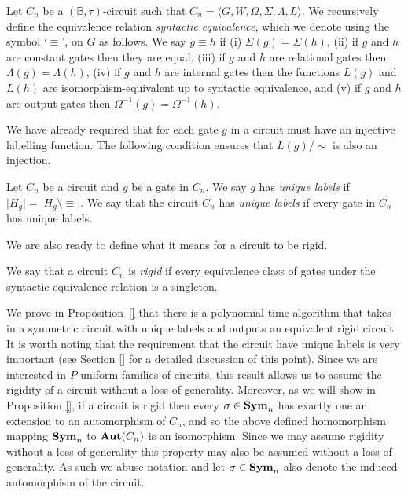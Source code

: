 \documentclass[../paper.tex]{subfiles}
\begin{document}
\begin{definition}
  Let $C_n$ be a $(\mathbb{B}, \tau)$-circuit such that $C_n = \langle G, W,
  \Omega, \Sigma, \Lambda, L\rangle$. We recursively define the equivalence
  relation \emph{syntactic equivalence}, which we denote using the symbol
  `$\equiv$', on $G$ as follows. We say $g \equiv h$ if (i) $\Sigma(g) =
  \Sigma(h)$, (ii) if $g$ and $h$ are constant gates then they are equal, (iii)
  if $g$ and $h$ are relational gates then $\Lambda(g) = \Lambda(h)$, (iv) if
  $g$ and $h$ are internal gates then the functions $L(g)$ and $L(h)$ are
  isomorphism-equivalent up to syntactic equivalence, and (v) if $g$ and $h$ are
  output gates then $\Omega^{-1}(g) = \Omega^{-1}(h)$.
\end{definition}

We have already required that for each gate $g$ in a circuit must have an
injective labelling function. The following condition ensures that $L(g)/{\sim}$
is also an injection.

\begin{definition}
  Let $C_n$ be a circuit and $g$ be a gate in $C_n$. We say $g$ has \emph{unique
    labels} if $\vert H_g \vert = \vert H_g \setminus \equiv \vert $. We say
  that the circuit $C_n$ has \emph{unique labels} if every gate in $C_n$ has
  unique labels.
\end{definition}

We are also ready to define what it means for a circuit to be rigid.

\begin{definition}
  We say that a circuit $C_n$ is \emph{rigid} if every equivalence class of
  gates under the syntactic equivalence relation is a singleton.
\end{definition}

We prove in Proposition~\ref{} that there is a polynomial time algorithm that
takes in a symmetric circuit with unique labels and outputs an equivalent rigid
circuit. It is worth noting that the requirement that the circuit have unique
labels is very important (see Section \ref{} for a detailed discussion of this
point). Since we are interested in $P$-uniform families of circuits, this result
allows us to assume the rigidity of a circuit without a loss of generality.
Moreover, as we will show in Proposition \ref{}, if a circuit is rigid then
every $\sigma \in \text{\textbf{Sym}}_n$ has exactly one an extension to an automorphism of
$C_n$, and so the above defined homomorphism mapping $\text{\textbf{Sym}}_n$ to $\text{\textbf{Aut}}(C_n)$ is
an isomorphism. Since we may assume rigidity without a loss of generality this
property may also be assumed without a loss of generality. As such we abuse
notation and let $\sigma \in \text{\textbf{Sym}}_n$ also denote the induced automorphism of the
circuit.
\end{document}
